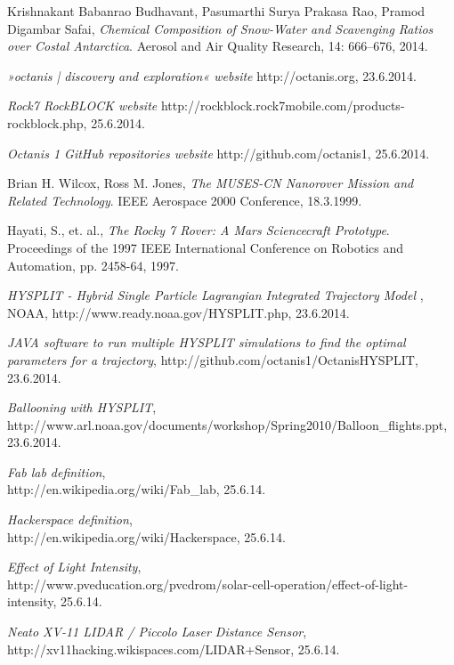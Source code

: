 \documentclass[a4paper,12pt]{article}
\begin{document}
\pagebreak
\pagestyle{empty}
\begin{thebibliography}{1}


  Krishnakant Babanrao Budhavant, Pasumarthi Surya Prakasa Rao, Pramod Digambar Safai,
  \emph{Chemical Composition of Snow-Water and Scavenging Ratios over Costal Antarctica}.
  Aerosol and Air Quality Research, 14: 666–676, 2014.

{\em »octanis | discovery and exploration« website} http://octanis.org, 23.6.2014.

{\em Rock7 RockBLOCK website} http://rockblock.rock7mobile.com/products-rockblock.php, 25.6.2014.


{\em Octanis 1 GitHub repositories website} http://github.com/octanis1, 25.6.2014.

  Brian H. Wilcox, Ross M. Jones, 
  \emph{The MUSES-CN Nanorover Mission and Related Technology}.
  IEEE Aerospace 2000 Conference, 18.3.1999.


  Hayati, S., et. al., 
  \emph{The Rocky 7 Rover: A Mars Sciencecraft Prototype}.
  Proceedings of the 1997 IEEE International Conference on Robotics and Automation, pp. 2458-64, 1997.

  {\em HYSPLIT - Hybrid Single Particle Lagrangian Integrated Trajectory Model }, NOAA, http://www.ready.noaa.gov/HYSPLIT.php, 23.6.2014.

  {\em JAVA software to run multiple HYSPLIT simulations to find the optimal parameters for a trajectory}, http://github.com/octanis1/OctanisHYSPLIT, 23.6.2014.

	{\em Ballooning with HYSPLIT}, \\
	http://www.arl.noaa.gov/documents/workshop/Spring2010/Balloon\_flights.ppt, 23.6.2014.

	{\em Fab lab definition}, \\
	http://en.wikipedia.org/wiki/Fab\_lab, 25.6.14.

	{\em Hackerspace definition}, \\
	http://en.wikipedia.org/wiki/Hackerspace, 25.6.14.

	{\em Effect of Light Intensity}, \\
	http://www.pveducation.org/pvcdrom/solar-cell-operation/effect-of-light-intensity, 25.6.14.

	{\em Neato XV-11 LIDAR / Piccolo Laser Distance Sensor}, \\
	http://xv11hacking.wikispaces.com/LIDAR+Sensor, 25.6.14.

\end{thebibliography}
\end{document}
